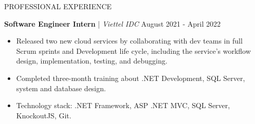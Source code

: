 \begin{rSection}{PROFESSIONAL EXPERIENCE}
    \vspace{1em}

    \quad\textbf{Software Engineer Intern} | \textit{Viettel IDC} \hfill August 2021 - April 2022\\
    \begin{itemize}
        \itemsep 0pt {} \vspace{-1em}
        \item Released two new cloud services by collaborating with dev teams in full Scrum sprints and Development life cycle,
              including the service's workflow design, implementation, testing, and debugging.
        \item Completed three-month training about .NET Development, SQL Server, system and database design.
        \item Technology stack: .NET Framework, ASP .NET MVC, SQL Server, KnockoutJS, Git.

    \end{itemize}

\end{rSection}



